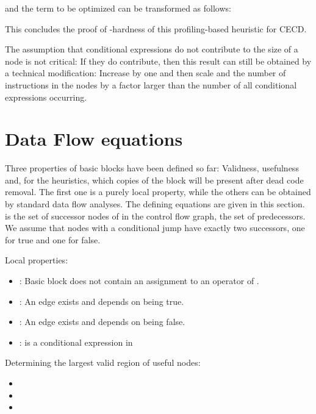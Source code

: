 \documentclass[halfparskip]{scrartcl}
\begin{document}
and the term to be optimized can be transformed as follows:


This concludes the proof of -hardness of this profiling-based heuristic for CECD.

The assumption that conditional expressions do not contribute to the size of a node is not critical: If they do contribute, then this result can still be obtained by a technical modification: Increase  by one and then scale  and the number of instructions in the nodes  by a factor larger than the number of all conditional expressions occurring.


\section{Data Flow equations}
\label{sec:df}

\newcommand{\V}{\text{Valid}}
\newcommand{\T}{\text{TrueEdge}}
\newcommand{\F}{\text{FalseEdge}}
\newcommand{\E}{\text{Expr}}
\renewcommand{\L}{\text{Live}}
\newcommand{\A}{\text{Antic}}
\renewcommand{\succ}[1]{\operatorname{succ}(#1)}
\newcommand{\pred}[1]{\operatorname{pred}(#1)}


Three properties of basic blocks have been defined so far: Validness, usefulness and, for the heuristics, which copies of the block will be present after dead code removal. The first one is a purely local property, while the others can be obtained by standard data flow analyses. The defining equations are given in this section.  is the set of successor nodes of  in the control flow graph,  the set of predecessors. We assume that nodes with a conditional jump have exactly two successors, one for true and one for false.

Local properties:
\begin{itemize}
\item : Basic block  does not contain an assignment to an operator of .
\item : An edge  exists and depends on  being true.
\item : An edge  exists and depends on  being false.
\item :  is a conditional expression in 
\end{itemize}

Determining the largest valid region  of useful nodes:
\begin{itemize}
\item 
\item 
\item 
\end{itemize}
\end{document}
